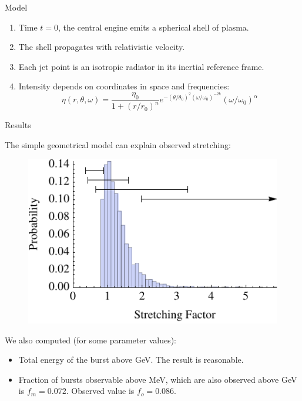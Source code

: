 \documentclass[final]{beamer}
\newlength{\onecolwid}
\newlength{\twocolwid}
\begin{document}
\begin{frame}[t]
\begin{columns}[t]
\begin{column}{\twocolwid}
\begin{columns}[t,totalwidth=\twocolwid]
\begin{column}{\onecolwid}
\begin{block}{Model}
\begin{enumerate}
	\item{Time $t = 0$, the central engine emits a spherical shell of plasma.}
	\item{The shell propagates with relativistic velocity.}
	\item{Each jet point is an isotropic radiator in its inertial reference frame.}
	\item{
		Intensity depends on coordinates in space and frequencies:
		\begin{equation*}
			\eta\left(r,\theta,\omega\right) = 
			\frac{\eta_0}{1 + \left(r/r_0\right)^n}
			e^{
				-\left(\theta/\theta_0\right)^2
				\left(\omega/\omega_0\right)^{-2k}
			}
			\left(\omega/\omega_0\right)^\alpha
		\end{equation*}
	}
\end{enumerate}

\end{block}

\begin{block}{Results}

The simple geometrical model can explain observed stretching:

\begin{figure}
	\includegraphics[width=\textwidth]{kappaDistributionHistogram}
\end{figure}

We also computed (for some parameter values):

\begin{itemize}
	\item{Total energy of the burst above \unit[1]{GeV}. The result is reasonable.}
	\item{Fraction of bursts observable above \unit[100]{MeV}, which are also observed above \unit[1]{GeV} is $f_m = 0.072$. Observed value is $f_o = 0.086$.}
\end{itemize}


\end{block}
\end{column}
\end{columns}
\end{column}
\end{columns}
\end{frame}
\end{document}
